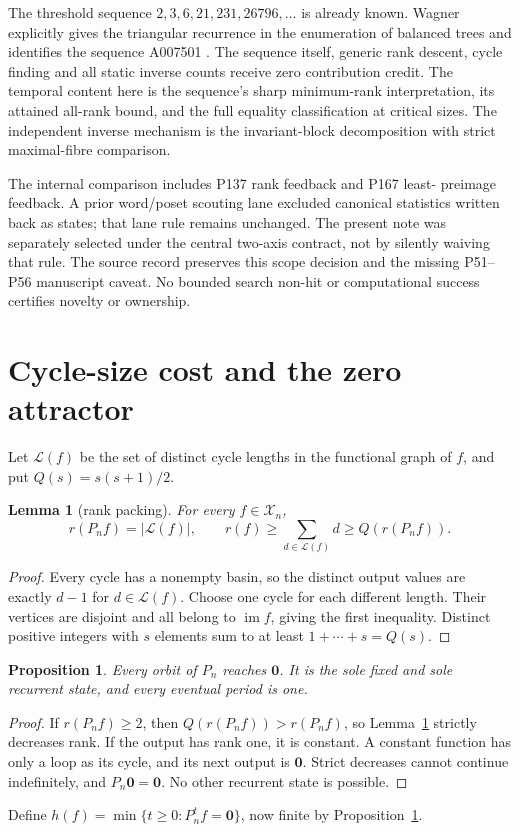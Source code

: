 \documentclass[a4paper,10pt]{amsart}
\newtheorem{lemma}[theorem]{Lemma}
\newtheorem{proposition}[theorem]{Proposition}
\theoremstyle{remark}
\newcommand{\im}{\operatorname{im}}
\newcommand{\calX}{\mathcal X}
\newcommand{\calL}{\mathcal L}
\newcommand{\zero}{\boldsymbol 0}
\begin{document}
The threshold sequence $2,3,6,21,231,26796,\ldots$ is already known.
Wagner explicitly gives the triangular recurrence in the enumeration of
balanced trees and identifies the sequence A007501
\cite[Section~4]{Wagner2014}. The sequence itself, generic rank descent,
cycle finding and all static inverse counts receive zero contribution
credit. The temporal content here is the sequence's sharp minimum-rank
interpretation, its attained all-rank bound, and the full equality
classification at critical sizes. The independent inverse mechanism is
the invariant-block decomposition with strict maximal-fibre comparison.

The internal comparison includes P137 rank feedback and P167 least-
preimage feedback. A prior word/poset scouting lane excluded canonical
statistics written back as states; that lane rule remains unchanged.
The present note was separately selected under the central two-axis
contract, not by silently waiving that rule. The source record preserves
this scope decision and the missing P51--P56 manuscript caveat. No bounded
search non-hit or computational success certifies novelty or ownership.

\section{Cycle-size cost and the zero attractor}
Let $\calL(f)$ be the set of distinct cycle lengths in the functional
graph of $f$, and put $Q(s)=s(s+1)/2$.
\begin{lemma}[rank packing]\label{lem:rank}
For every $f\in\calX_n$,
\begin{equation}\label{eq:rank}
 r(P_nf)=|\calL(f)|,\qquad
 r(f)\ge\sum_{d\in\calL(f)}d\ge Q(r(P_nf)).
\end{equation}
\end{lemma}
\begin{proof}
Every cycle has a nonempty basin, so the distinct output values are
exactly $d-1$ for $d\in\calL(f)$. Choose one cycle for each different
length. Their vertices are disjoint and all belong to $\im f$, giving
the first inequality. Distinct positive integers with $s$ elements sum
to at least $1+\cdots+s=Q(s)$.
\end{proof}

\begin{proposition}\label{prop:zero}
Every orbit of $P_n$ reaches $\zero$. It is the sole fixed and sole
recurrent state, and every eventual period is one.
\end{proposition}
\begin{proof}
If $r(P_nf)\ge2$, then $Q(r(P_nf))>r(P_nf)$, so
Lemma~\ref{lem:rank} strictly decreases rank. If the output has rank one,
it is constant. A constant function has only a loop as its cycle, and
its next output is $\zero$. Strict decreases cannot continue indefinitely,
and $P_n\zero=\zero$. No other recurrent state is possible.
\end{proof}
Define $h(f)=\min\{t\ge0:P_n^tf=\zero\}$, now finite by
Proposition~\ref{prop:zero}.
\end{document}

